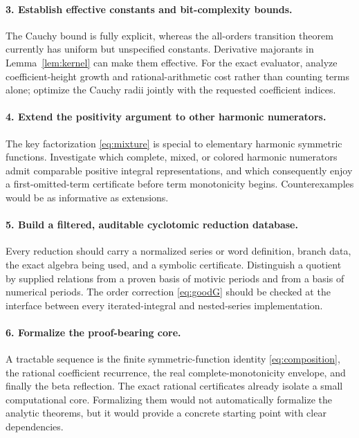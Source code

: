 \documentclass[11pt]{article}
\numberwithin{equation}{section}
\theoremstyle{definition}\newtheorem{definition}[theorem]{Definition}
\theoremstyle{remark}\newtheorem{remark}[theorem]{Remark}
\begin{document}
\paragraph{3. Establish effective constants and bit-complexity bounds.}
The Cauchy bound is fully explicit, whereas the all-orders transition theorem currently has uniform but unspecified constants. Derivative majorants in Lemma~\ref{lem:kernel} can make them effective. For the exact evaluator, analyze coefficient-height growth and rational-arithmetic cost rather than counting terms alone; optimize the Cauchy radii jointly with the requested coefficient indices.

\paragraph{4. Extend the positivity argument to other harmonic numerators.}
The key factorization \eqref{eq:mixture} is special to elementary harmonic symmetric functions. Investigate which complete, mixed, or colored harmonic numerators admit comparable positive integral representations, and which consequently enjoy a first-omitted-term certificate before term monotonicity begins. Counterexamples would be as informative as extensions.

\paragraph{5. Build a filtered, auditable cyclotomic reduction database.}
Every reduction should carry a normalized series or word definition, branch data, the exact algebra being used, and a symbolic certificate. Distinguish a quotient by supplied relations from a proven basis of motivic periods and from a basis of numerical periods. The order correction \eqref{eq:goodG} should be checked at the interface between every iterated-integral and nested-series implementation.

\paragraph{6. Formalize the proof-bearing core.}
A tractable sequence is the finite symmetric-function identity \eqref{eq:composition}, the rational coefficient recurrence, the real complete-monotonicity envelope, and finally the beta reflection. The exact rational certificates already isolate a small computational core. Formalizing them would not automatically formalize the analytic theorems, but it would provide a concrete starting point with clear dependencies.
\end{document}
